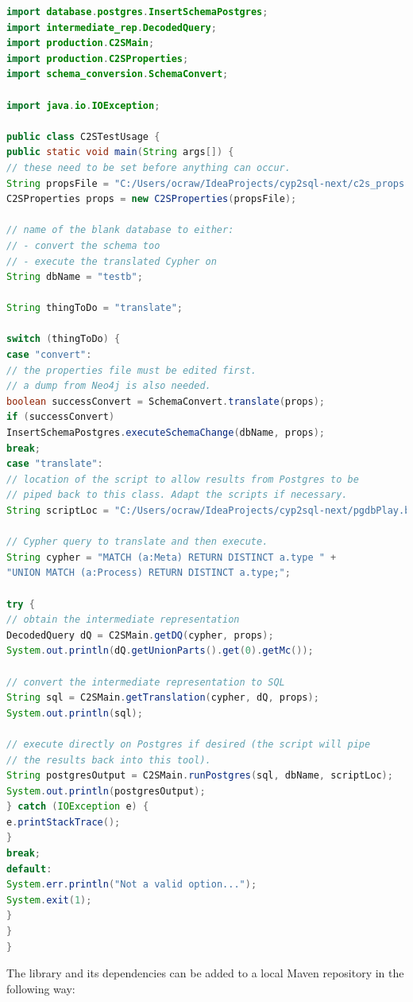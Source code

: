 \documentclass[letterpaper]{ltxdoc}
\begin{document}
\begin{lstlisting}[language=Java]
import database.postgres.InsertSchemaPostgres;
import intermediate_rep.DecodedQuery;
import production.C2SMain;
import production.C2SProperties;
import schema_conversion.SchemaConvert;

import java.io.IOException;

public class C2STestUsage {
public static void main(String args[]) {
// these need to be set before anything can occur.
String propsFile = "C:/Users/ocraw/IdeaProjects/cyp2sql-next/c2s_props.properties";
C2SProperties props = new C2SProperties(propsFile);

// name of the blank database to either:
// - convert the schema too
// - execute the translated Cypher on
String dbName = "testb";

String thingToDo = "translate";

switch (thingToDo) {
case "convert":
// the properties file must be edited first.
// a dump from Neo4j is also needed.
boolean successConvert = SchemaConvert.translate(props);
if (successConvert)
InsertSchemaPostgres.executeSchemaChange(dbName, props);
break;
case "translate":
// location of the script to allow results from Postgres to be
// piped back to this class. Adapt the scripts if necessary.
String scriptLoc = "C:/Users/ocraw/IdeaProjects/cyp2sql-next/pgdbPlay.bat";

// Cypher query to translate and then execute.
String cypher = "MATCH (a:Meta) RETURN DISTINCT a.type " +
"UNION MATCH (a:Process) RETURN DISTINCT a.type;";

try {
// obtain the intermediate representation
DecodedQuery dQ = C2SMain.getDQ(cypher, props);
System.out.println(dQ.getUnionParts().get(0).getMc());

// convert the intermediate representation to SQL
String sql = C2SMain.getTranslation(cypher, dQ, props);
System.out.println(sql);

// execute directly on Postgres if desired (the script will pipe
// the results back into this tool).
String postgresOutput = C2SMain.runPostgres(sql, dbName, scriptLoc);
System.out.println(postgresOutput);
} catch (IOException e) {
e.printStackTrace();
}
break;
default:
System.err.println("Not a valid option...");
System.exit(1);
}
}
}
\end{lstlisting}

\medskip

The library and its dependencies can be added to a local Maven repository in the following way:
\end{document}
